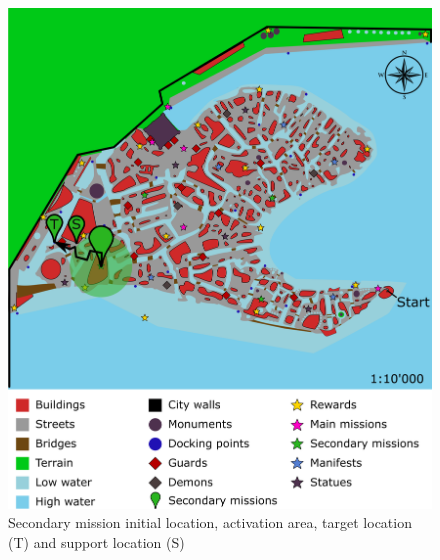 \begin{figure}[H]
  \centering
  \includegraphics[width=\textwidth]{../Images/Maps/dynamiaSecondaryMissions_Councilman}
  \caption{Secondary mission initial location, activation area, target location (T) and support location (S)}
\end{figure}

